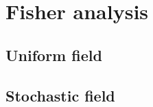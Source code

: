 \section{Fisher analysis}
\label{sec:fisher}

\subsection{Uniform field}
\label{subsec:fisher_uniform}

\subsection{Stochastic field}
\label{subsec:fisher_SI}
